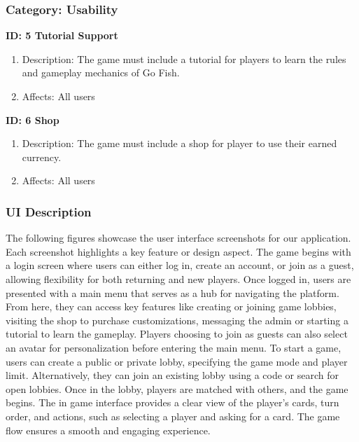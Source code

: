 \subsubsection{Category: Usability}

\textbf{ID: 5 Tutorial Support}
\begin{enumerate}
    \item Description: The game must include a tutorial for players to learn the rules and gameplay mechanics of Go Fish.
    \item Affects: All users
\end{enumerate}

\textbf{ID: 6 Shop}
\begin{enumerate}
    \item Description: The game must include a shop for player to use their earned currency.
    \item Affects: All users
\end{enumerate}

\subsubsection{UI Description}

The following figures showcase the user interface screenshots for our application. Each screenshot highlights a key feature or design aspect. The game begins with a login screen where users can either log in, create an account, or join as a guest, allowing flexibility for both returning and new players. Once logged in, users are presented with a main menu that serves as a hub for navigating the platform. From here, they can access key features like creating or joining game lobbies, visiting the shop to purchase customizations, messaging the admin or starting a tutorial to learn the gameplay. Players choosing to join as guests can also select an avatar for personalization before entering the main menu. To start a game, users can create a public or private lobby, specifying the game mode and player limit. Alternatively, they can join an existing lobby using a code or search for open lobbies. Once in the lobby, players are matched with others, and the game begins. The in game interface provides a clear view of the player's cards, turn order, and actions, such as selecting a player and asking for a card. The game flow ensures a smooth and engaging experience.

